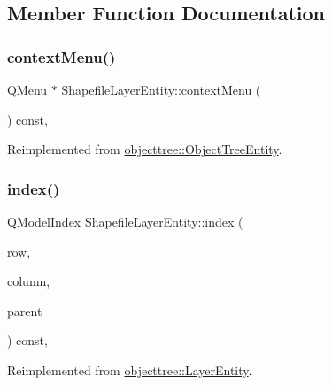 \subsection{Member Function Documentation}
\mbox{\label{classobjecttree_1_1_shapefile_layer_entity_a576599710112cc0f18dc6ae86ae317c3}} 
\subsubsection{\texorpdfstring{contextMenu()}{contextMenu()}}
{\footnotesize\ttfamily Q\+Menu $\ast$ Shapefile\+Layer\+Entity\+::context\+Menu (\begin{DoxyParamCaption}{ }\end{DoxyParamCaption}) const\hspace{0.3cm}{\ttfamily [override]}, {\ttfamily [virtual]}}



Reimplemented from \mbox{\hyperlink{classobjecttree_1_1_object_tree_entity_a0dd10b6074f96af281b6f7a68c492b75}{objecttree\+::\+Object\+Tree\+Entity}}.

\mbox{\label{classobjecttree_1_1_shapefile_layer_entity_a05d31fc56c4c57c919bd1bab7fd31ca9}} 
\subsubsection{\texorpdfstring{index()}{index()}}
{\footnotesize\ttfamily Q\+Model\+Index Shapefile\+Layer\+Entity\+::index (\begin{DoxyParamCaption}\item[{int}]{row,  }\item[{int}]{column,  }\item[{const Q\+Model\+Index \&}]{parent }\end{DoxyParamCaption}) const\hspace{0.3cm}{\ttfamily [override]}, {\ttfamily [virtual]}}



Reimplemented from \mbox{\hyperlink{classobjecttree_1_1_layer_entity_a168d47ed5cdde5455a5b0f124cbee0a9}{objecttree\+::\+Layer\+Entity}}.

